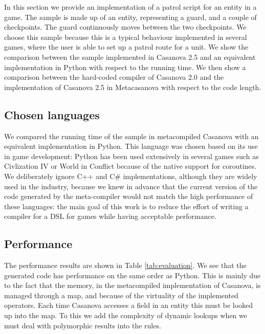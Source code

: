 In this section we provide an implementation of a patrol script for an entity in a game. The sample is made up of an entity, representing a guard, and a couple of checkpoints. The guard continuously moves between the two checkpoints. We choose this sample because this is a typical behaviour implemented in several games, where the user is able to set up a patrol route for a unit. We show the comparison between the sample implemented in Casanova 2.5 and an equivalent implementation in Python with respect to the running time. We then show a comparison between the hard-coded compiler of Casanova 2.0 and the implementation of Casanova 2.5 in Metacasanova with respect to the code length. 

\subsection{Chosen languages}
We compared the running time of the sample in metacompiled Casanova with an equivalent implementation in Python. This language was chosen based on its use in game development: Python has been used extensively in several games such as Civlization IV \cite{CIV4} or World in Conflict \cite{WIC} because of the native support for coroutines. We deliberately ignore C++ and C\# implementations, although they are widely used in the industry, because we knew in advance \cite{CASANOVA2_PAPER} that the current version of the code generated by the meta-compiler would not match the high performance of these languages: the main goal of this work is to reduce the effort of writing a compiler for a DSL for games while having acceptable performance.


\subsection{Performance}
The performance results are shown in Table \ref{tab:evaluation}. We see that the generated code has performance on the same order as Python. This is mainly due to the fact that the memory, in the metacompiled implementation of Casanova, is managed through a map, and because of the virtuality of the implemented operators. Each time Casanova accesses a field in an entity this must be looked up into the map. To this we add the complexity of dynamic lookups when we must deal with polymorphic results into the rules. 

